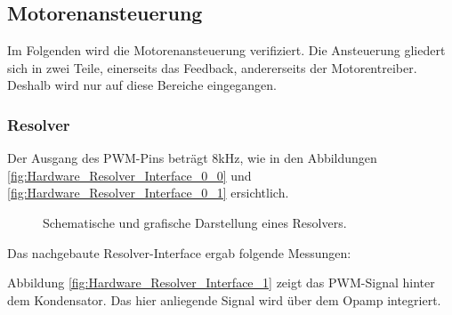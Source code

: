 \subsection{Motorenansteuerung}\label{subsec:Hardware_Motorenansteuerung}

Im Folgenden wird die Motorenansteuerung verifiziert. Die Ansteuerung gliedert sich in zwei Teile, einerseits das Feedback, andererseits der Motorentreiber. Deshalb wird nur auf diese Bereiche eingegangen.

\subsubsection{Resolver}\label{subsubsec:Hardware_Resolver}

Der Ausgang des PWM-Pins beträgt 8kHz, wie in den Abbildungen \ref{fig:Hardware_Resolver_Interface_0_0} und \ref{fig:Hardware_Resolver_Interface_0_1} ersichtlich.


\begin{figure}[h!]
\centering
{}
\hfill
{}
\hfill
\caption{Schematische und grafische Darstellung eines Resolvers.}
\label{fig:Hardware_Resolver_Interface_0}
\end{figure}

Das nachgebaute Resolver-Interface ergab folgende Messungen:

Abbildung \ref{fig:Hardware_Resolver_Interface_1} zeigt das PWM-Signal hinter dem Kondensator. Das hier anliegende Signal wird über dem Opamp integriert.

